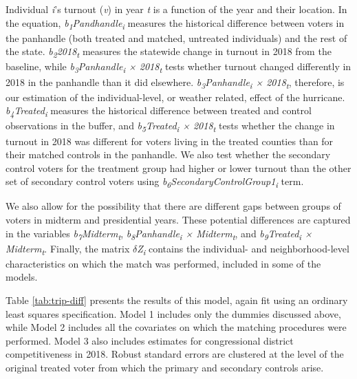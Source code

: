 \documentclass[
  12pt,
]{article}
\begin{document}
Individual \emph{i}'s turnout (\emph{v}) in year \emph{t} is a function of the year and their location. In the equation, \emph{b\textsubscript{1}Pandhandle\textsubscript{i}} measures the historical difference between voters in the panhandle (both treated and matched, untreated individuals) and the rest of the state. \emph{b\textsubscript{2}2018\textsubscript{t}} measures the statewide change in turnout in 2018 from the baseline, while \emph{b\textsubscript{3}Panhandle\textsubscript{i} × 2018\textsubscript{t}} tests whether turnout changed differently in 2018 in the panhandle than it did elsewhere. \emph{b\textsubscript{3}Panhandle\textsubscript{i} × 2018\textsubscript{t}}, therefore, is our estimation of the individual-level, or weather related, effect of the hurricane. \emph{b\textsubscript{4}Treated\textsubscript{i}} measures the historical difference between treated and control observations in the buffer, and \emph{b\textsubscript{5}Treated\textsubscript{i} × 2018\textsubscript{t}} tests whether the change in turnout in 2018 was different for voters living in the treated counties than for their matched controls in the panhandle. We also test whether the secondary control voters for the treatment group had higher or lower turnout than the other set of secondary control voters using \emph{b\textsubscript{6}SecondaryControlGroup1\textsubscript{i}} term.

We also allow for the possibility that there are different gaps between groups of voters in midterm and presidential years. These potential differences are captured in the variables \emph{b\textsubscript{7}Midterm\textsubscript{t}}, \emph{b\textsubscript{8}Panhandle\textsubscript{i} × Midterm\textsubscript{t}}, and \emph{b\textsubscript{9}Treated\textsubscript{i} × Midterm\textsubscript{t}}. Finally, the matrix \emph{\(\delta\)Z\textsubscript{i}} contains the individual- and neighborhood-level characteristics on which the match was performed, included in some of the models.

Table \ref{tab:trip-diff} presents the results of this model, again fit using an ordinary least squares specification. Model 1 includes only the dummies discussed above, while Model 2 includes all the covariates on which the matching procedures were performed. Model 3 also includes estimates for congressional district competitiveness in 2018. Robust standard errors are clustered at the level of the original treated voter from which the primary and secondary controls arise.

\begin{singlespace}


\end{singlespace}
\end{document}

